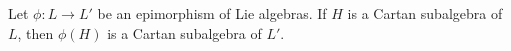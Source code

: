 Let $\phi: L \to L'$ be an epimorphism of Lie algebras. If $H$ is a Cartan subalgebra of $L$, then $\phi(H)$ is a Cartan subalgebra of $L'$.
